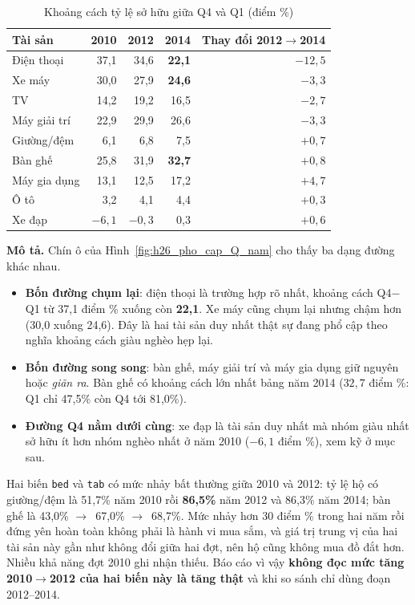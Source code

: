 \documentclass[11pt,a4paper]{article}
\newcommand{\ra}{$\rightarrow$}
\newcommand{\n}[1]{\textbf{#1}}
\begin{document}
\begin{table}[H]\centering\small
\caption{Khoảng cách tỷ lệ sở hữu giữa Q4 và Q1 (điểm \%)}
\begin{tabular}{lrrrr}
\toprule
Tài sản & 2010 & 2012 & 2014 & Thay đổi 2012\ra2014\\
\midrule
Điện thoại & 37,1 & 34,6 & \textbf{22,1} & $-12{,}5$\\
Xe máy & 30,0 & 27,9 & \textbf{24,6} & $-3{,}3$\\
TV & 14,2 & 19,2 & 16,5 & $-2{,}7$\\
Máy giải trí & 22,9 & 29,9 & 26,6 & $-3{,}3$\\
Giường/đệm & 6,1 & 6,8 & 7,5 & $+0{,}7$\\
Bàn ghế & 25,8 & 31,9 & \textbf{32,7} & $+0{,}8$\\
Máy gia dụng & 13,1 & 12,5 & 17,2 & $+4{,}7$\\
Ô tô & 3,2 & 4,1 & 4,4 & $+0{,}3$\\
Xe đạp & $-6{,}1$ & $-0{,}3$ & 0,3 & $+0{,}6$\\
\bottomrule
\end{tabular}
\end{table}

\textbf{Mô tả.} Chín ô của Hình~\ref{fig:h26_pho_cap_Q_nam} cho thấy ba dạng đường khác nhau.

\begin{itemize}[leftmargin=1.3em,itemsep=3pt,topsep=2pt]
\item \n{Bốn đường chụm lại}: điện thoại là trường hợp rõ nhất, khoảng cách Q4$-$Q1 từ 37,1 điểm \% xuống còn \n{22,1}. Xe máy cũng chụm lại nhưng chậm hơn (30,0 xuống 24,6). Đây là hai tài sản duy nhất thật sự đang phổ cập theo nghĩa khoảng cách giàu nghèo hẹp lại.
\item \n{Bốn đường song song}: bàn ghế, máy giải trí và máy gia dụng giữ nguyên hoặc \emph{giãn ra}. Bàn ghế có khoảng cách lớn nhất bảng năm 2014 ($32{,}7$ điểm \%: Q1 chỉ 47,5\% còn Q4 tới 81,0\%).
\item \n{Đường Q4 nằm dưới cùng}: xe đạp là tài sản duy nhất mà nhóm giàu nhất sở hữu ít hơn nhóm nghèo nhất ở năm 2010 ($-6{,}1$ điểm \%), xem kỹ ở mục sau.
\end{itemize}

\begin{luuy}
Hai biến \texttt{bed} và \texttt{tab} có mức nhảy bất thường giữa 2010 và 2012: tỷ lệ hộ có giường/đệm là 51,7\% năm 2010 rồi \n{86,5\%} năm 2012 và 86,3\% năm 2014; bàn ghế là 43,0\% \ra\ 67,0\% \ra\ 68,7\%. Mức nhảy hơn 30 điểm \% trong hai năm rồi đứng yên hoàn toàn không phải là hành vi mua sắm, và giá trị trung vị của hai tài sản này gần như không đổi giữa hai đợt, nên hộ cũng không mua đồ đắt hơn. Nhiều khả năng đợt 2010 ghi nhận thiếu. Báo cáo vì vậy \n{không đọc mức tăng 2010\ra2012 của hai biến này là tăng thật} và khi so sánh chỉ dùng đoạn 2012–2014.
\end{luuy}
\end{document}
